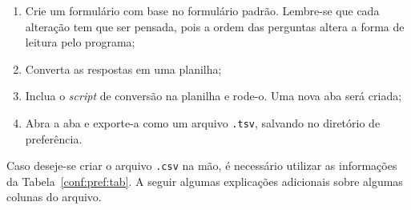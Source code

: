 \documentclass[a4paper, 12pt]{report}
\begin{document}
\begin{enumerate}
\item Crie um formulário com base no formulário padrão. Lembre-se que
  cada alteração tem que ser pensada, pois a ordem das perguntas
  altera a forma de leitura pelo programa;

\item Converta as respostas em uma planilha;

\item Inclua o \textit{script} de conversão na planilha e rode-o. Uma
  nova aba será criada;

\item Abra a aba e exporte-a como um arquivo \verb+.tsv+, salvando no
  diretório de preferência.
\end{enumerate}

Caso deseje-se criar o arquivo \texttt{.csv} na mão, é necessário
utilizar as informações da Tabela~\ref{conf:pref:tab}. A seguir
algumas explicações adicionais sobre algumas colunas do arquivo.
\end{document}
